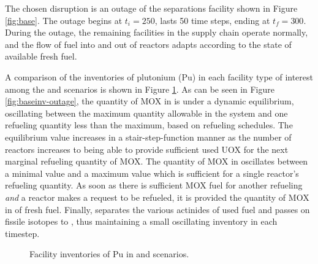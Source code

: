 The chosen disruption is an outage of the separations facility shown in Figure
\ref{fig:base}. The outage begins at $t_i = 250$, lasts 50 time steps, ending at
$t_f = 300$. During the outage, the remaining facilities in the supply chain
operate normally, and the flow of fuel into and out of reactors adapts according
to the state of available fresh fuel.

A comparison of the inventories of plutonium (Pu) in each facility type of
interest among the \basecase and \outage scenarios is shown in Figure
\ref{fig:outage}. As can be seen in Figure \ref{fig:baseinv-outage}, the
quantity of MOX in \reactors is under a dynamic equilibrium, oscillating between
the maximum quantity allowable in the system and one refueling quantity less
than the maximum, based on refueling schedules. The equilibrium value increases
in a stair-step-function manner as the number of reactors increases to being
able to provide sufficient used UOX for the next marginal refueling quantity of
MOX. The quantity of MOX in \fabrication oscillates between a minimal value and
a maximum value which is sufficient for a single reactor's refueling
quantity. As soon as there is sufficient MOX fuel for another refueling
\textit{and} a reactor makes a request to be refueled, it is provided the
quantity of MOX in of fresh fuel. Finally, \separations separates the various
actinides of used fuel and passes on fissile isotopes to \fabrication, thus
maintaining a small oscillating inventory in each timestep.

\begin{figure}
  \centering
  \begin{minipage}{0.67\textwidth}
    \centering 
    \vfill 
  \end{minipage}%
  \begin{minipage}{0.33\textwidth}
    \centering
  \end{minipage}%
  \caption[]{
    \label{fig:outage}
    Facility inventories of Pu in \basecase and \outage scenarios.}
\end{figure}

